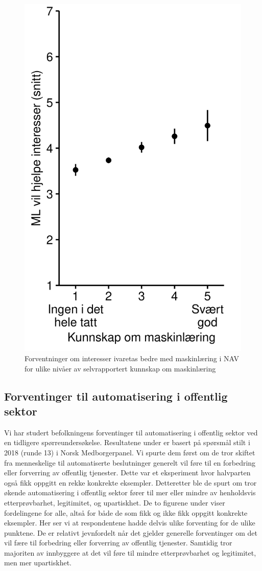 \documentclass[
  12pt,
  a4paper, 12pt]{article}
\begin{document}
\begin{figure}

{\centering \includegraphics[width=0.4\linewidth]{figs/png/fig_nav_ml_helps_interest_by_knowledge} 

}

\caption{Forventninger om interesser ivaretas bedre med maskinlæring i NAV for ulike nivåer av selvrapportert kunnskap om maskinlæring}\label{fig:unnamed-chunk-19}
\end{figure}

\hypertarget{forventinger-til-automatisering-i-offentlig-sektor}{%
\subsection{Forventinger til automatisering i offentlig sektor}\label{forventinger-til-automatisering-i-offentlig-sektor}}

Vi har studert befolkningens forventinger til automatisering i offentlig sektor ved en tidligere spørreundersøkelse.
Resultatene under er basert på spørsmål stilt i 2018 (runde 13) i Norsk Medborgerpanel.
Vi spurte dem først om de tror skiftet fra menneskelige til automatiserte beslutninger generelt vil føre til en forbedring eller forverring av offentlig tjenester.
Dette var et eksperiment hvor halvparten også fikk oppgitt en rekke konkrekte eksempler.
Detteretter ble de spurt om tror økende automatisering i offentlig sektor fører til mer eller mindre av henholdsvis etterprøvbarhet, legitimitet, og upartiskhet.
De to figurene under viser fordelingene for alle, altså for både de som fikk og ikke fikk oppgitt konkrekte eksempler.
Her ser vi at respondentene hadde delvis ulike forventing for de ulike punktene.
De er relativt jevnfordelt når det gjelder generelle forventinger om det vil fære til forbedring eller forverring av offentlig tjenester.
Samtidig tror majoriten av innbyggere at det vil føre til mindre etterprøvbarhet og legitimitet, men mer upartiskhet.
\end{document}
